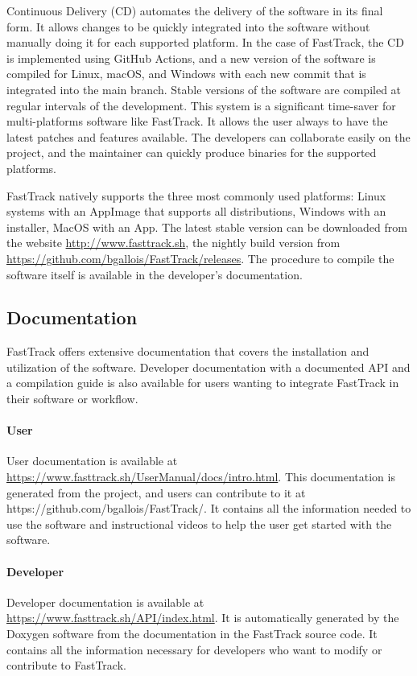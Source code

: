     Continuous Delivery (CD) automates the delivery of the software in its final form. It allows changes to be quickly integrated into the software without manually doing it for each supported platform. In the case of FastTrack, the CD is implemented using GitHub Actions, and a new version of the software is compiled for Linux, macOS, and Windows with each new commit that is integrated into the main branch. Stable versions of the software are compiled at regular intervals of the development. This system is a significant time-saver for multi-platforms software like FastTrack. It allows the user always to have the latest patches and features available. The developers can collaborate easily on the project, and the maintainer can quickly produce binaries for the supported platforms.

    FastTrack natively supports the three most commonly used platforms: Linux systems with an AppImage that supports all distributions, Windows with an installer, MacOS with an App. The latest stable version can be downloaded from the website \url{http://www.fasttrack.sh}, the nightly build version from \url{https://github.com/bgallois/FastTrack/releases}. The procedure to compile the software itself is available in the developer's documentation.

    \subsection{Documentation}
    FastTrack offers extensive documentation that covers the installation and utilization of the software. Developer documentation with a documented API and a compilation guide is also available for users wanting to integrate FastTrack in their software or workflow.

    \paragraph{User} User documentation is available at \url{https://www.fasttrack.sh/UserManual/docs/intro.html}. This documentation is generated from the project, and users can contribute to it at https://github.com/bgallois/FastTrack/. It contains all the information needed to use the software and instructional videos to help the user get started with the software.
    \paragraph{Developer} Developer documentation is available at \url{https://www.fasttrack.sh/API/index.html}. It is automatically generated by the Doxygen software from the documentation in the FastTrack source code. It contains all the information necessary for developers who want to modify or contribute to FastTrack.


